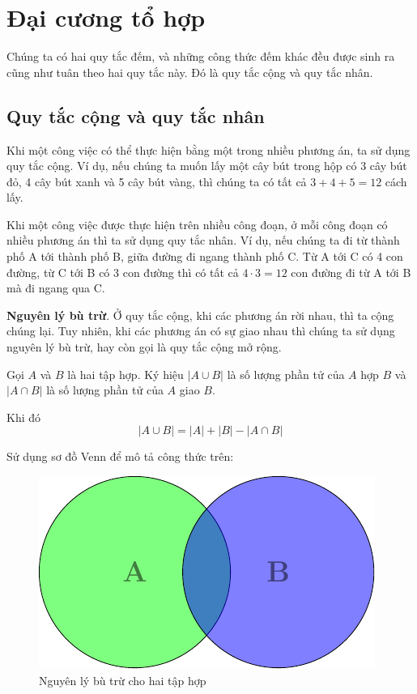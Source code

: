 \chapter{Đại cương tổ hợp}

Chúng ta có hai quy tắc đếm, và những công thức đếm khác đều
được sinh ra cũng như tuân theo hai quy tắc này. Đó là quy
tắc cộng và quy tắc nhân.

\section{Quy tắc cộng và quy tắc nhân}

Khi một công việc có thể thực hiện bằng một trong nhiều phương án,
ta sử dụng quy tắc cộng. Ví dụ, nếu chúng ta muốn lấy một cây bút
trong hộp có 3 cây bút đỏ, 4 cây bút xanh và 5 cây bút vàng, thì
chúng ta có tất cả $3+4+5=12$ cách lấy.

Khi một công việc được thực hiện trên nhiều công đoạn, ở mỗi
công đoạn có nhiều phương án thì ta sử dụng quy tắc nhân.
Ví dụ, nếu chúng ta đi từ thành phố A tới thành phố B, giữa
đường đi ngang thành phố C. Từ A tới C có 4 con đường, từ C
tới B có 3 con đường thì có tất cả $4 \cdot 3 = 12$ con đường đi
từ A tới B mà đi ngang qua C.

\textbf{Nguyên lý bù trừ}. Ở quy tắc cộng, khi các phương án
rời nhau, thì ta cộng chúng lại. Tuy nhiên, khi các phương 
án có sự giao nhau thì chúng ta sử dụng nguyên lý bù trừ,
hay còn gọi là quy tắc cộng mở rộng.

Gọi $A$ và $B$ là hai tập hợp. Ký hiệu $\lvert A \cup B\rvert$ là
số lượng phần tử của $A$ hợp $B$ và $\lvert A \cap B \rvert$ là
số lượng phần tử của $A$ giao $B$.

Khi đó
\begin{equation}
    \lvert A \cup B \rvert = \lvert A \rvert + \lvert B \rvert
        - \lvert A \cap B \rvert
\end{equation}

Sử dụng sơ đồ Venn để mô tả công thức trên:

\begin{figure}[ht]
    \centering
    \includegraphics{../pics/set/venn1.pdf}
    \caption{Nguyên lý bù trừ cho hai tập hợp}
\end{figure}

